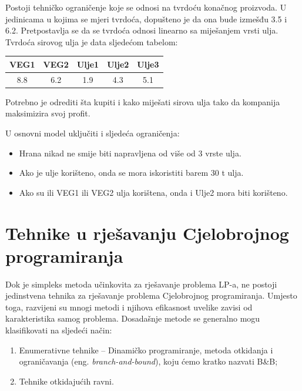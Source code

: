 \documentclass[a4paper, utf8, 11pt, colorlinks]{book}
\begin{document}
\begin{enumerate}
Postoji tehničko ograničenje koje se odnosi na tvrdoću konačnog proizvoda. U jedinicama u kojima se mjeri tvrdoća, dopušteno je da ona bude izmešđu 3.5 i 6.2. Pretpostavlja se da se tvrdoća odnosi linearno sa miješanjem vrsti ulja. Tvrdoća sirovog ulja je data sljedećom tabelom: 
\begin{table}[H]
	\centering
	\begin{tabular}{ccccc}
		    VEG1 & VEG2 & Ulje1 & Ulje2 & Ulje3 \\ \hline
		    8.8  & 6.2  & 1.9   & 4.3   & 5.1   \\
    \end{tabular} 
\end{table}

Potrebno je odrediti šta kupiti i kako miješati sirova ulja tako da kompanija maksimizira svoj profit. 

U osnovni model uključiti i sljedeća ograničenja:
\begin{itemize}
	\item Hrana nikad ne smije biti napravljena od više od 3 vrste ulja. 
	\item Ako je ulje korišteno, onda se mora iskoristiti barem 30 t ulja.
	\item Ako su ili VEG1 ili VEG2 ulja korištena, onda i Ulje2 mora biti korišteno.  
\end{itemize}

\end{enumerate}                                                       


 \chapter{Tehnike u rješavanju Cjelobrojnog programiranja}
 
 Dok je simpleks metoda učinkovita za rješavanje  problema LP-a, ne postoji jedinstvena tehnika za rješavanje problema Cjelobrojnog programiranja. Umjesto toga, razvijeni su mnogi metodi i njihova efikasnost
 uvelike zavisi od karakteristika samog problema. Dosadašnje metode se generalno mogu klasifikovati na sljedeći način:
 \begin{enumerate}
     \item Enumerativne tehnike -- Dinamičko programiranje, metoda otkidanja i ograničavanja (eng. \emph{branch-and-bound}), koju ćemo kratko nazvati B\&B;
     \item Tehnike otkidajućih ravni.
 \end{enumerate}
\end{document}
